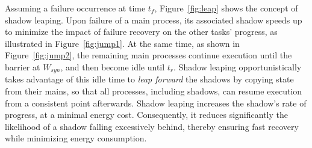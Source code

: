 Assuming a failure occurrence at time $t_f$, Figure~\ref{fig:leap} shows the concept of shadow leaping. 
Upon failure of a main process, its associated shadow speeds up to minimize the impact of failure recovery on the other tasks' progress, as illustrated in Figure~\ref{fig:jump1}. 
At the same time, as shown in Figure~\ref{fig:jump2}, the remaining main processes continue execution until the barrier at $W_{syn}$, and then become idle until $t_r$. %
Shadow leaping opportunistically takes advantage of this idle time to {\it leap forward} the shadows by copying state from their mains, so that  
all processes, including shadows, can resume execution from a consistent point afterwards. %
Shadow leaping increases the shadow's rate of progress, at a minimal energy cost. Consequently, it reduces significantly the likelihood of a shadow falling excessively behind, thereby ensuring fast recovery while minimizing energy consumption.



